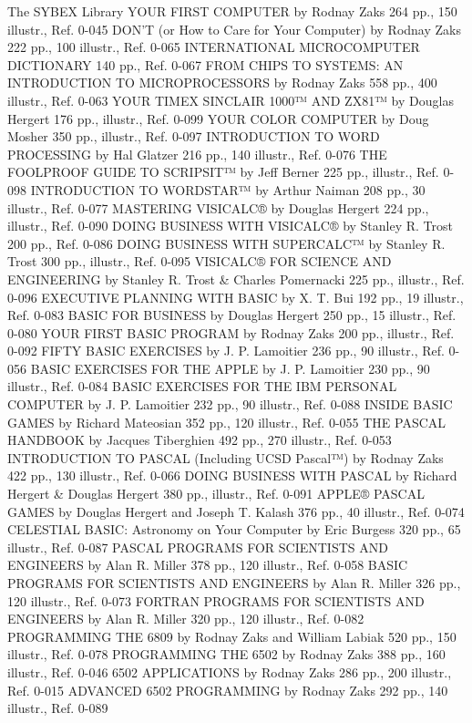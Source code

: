 {{{{{{{{{{{{{{{{{{{{{{{{{{{{{{{{{{{{{{{{{{{{{{{{{{{{{{{{{{{{{{{{{{{{{{{{{{{{{{{{{{{{{{{{{{{{{{{{{{{{{{{{{{{{{{{{{{{{{{{{{{{{{{{{{{{{{{{{{{{{The SYBEX Library
YOUR FIRST COMPUTER
by Rodnay Zaks 264 pp., 150 illustr., Ref. 0-045
DON'T (or How to Care for Your Computer)
by Rodnay Zaks 222 pp., 100 illustr., Ref. 0-065
INTERNATIONAL MICROCOMPUTER DICTIONARY
140 pp., Ref. 0-067
FROM CHIPS TO SYSTEMS:
AN INTRODUCTION TO MICROPROCESSORS
by Rodnay Zaks 558 pp., 400 illustr., Ref. 0-063
YOUR TIMEX SINCLAIR 1000™ AND ZX81™
by Douglas Hergert 176 pp., illustr., Ref. 0-099
YOUR COLOR COMPUTER
by Doug Mosher 350 pp., illustr., Ref. 0-097
INTRODUCTION TO WORD PROCESSING
by Hal Glatzer 216 pp., 140 illustr., Ref. 0-076
THE FOOLPROOF GUIDE TO SCRIPSIT™
by Jeff Berner 225 pp., illustr., Ref. 0-098
INTRODUCTION TO WORDSTAR™
by Arthur Naiman 208 pp., 30 illustr., Ref. 0-077
MASTERING VISICALC®
by Douglas Hergert 224 pp., illustr., Ref. 0-090
DOING BUSINESS WITH VISICALC®
by Stanley R. Trost 200 pp., Ref. 0-086
DOING BUSINESS WITH SUPERCALC™
by Stanley R. Trost 300 pp., illustr., Ref. 0-095
VISICALC® FOR SCIENCE AND ENGINEERING
by Stanley R. Trost & Charles Pomernacki 225 pp., illustr., Ref. 0-096
EXECUTIVE PLANNING WITH BASIC
by X. T. Bui 192 pp., 19 illustr., Ref. 0-083
BASIC FOR BUSINESS
by Douglas Hergert 250 pp., 15 illustr., Ref. 0-080
YOUR FIRST BASIC PROGRAM
by Rodnay Zaks 200 pp., illustr., Ref. 0-092
FIFTY BASIC EXERCISES
by J. P. Lamoitier 236 pp., 90 illustr., Ref. 0-056
BASIC EXERCISES FOR THE APPLE
by J. P. Lamoitier 230 pp., 90 illustr., Ref. 0-084
BASIC EXERCISES FOR THE IBM PERSONAL COMPUTER
by J. P. Lamoitier 232 pp., 90 illustr., Ref. 0-088
INSIDE BASIC GAMES
by Richard Mateosian 352 pp., 120 illustr., Ref. 0-055
THE PASCAL HANDBOOK
by Jacques Tiberghien 492 pp., 270 illustr., Ref. 0-053
INTRODUCTION TO PASCAL (Including UCSD Pascal™)
by Rodnay Zaks 422 pp., 130 illustr., Ref. 0-066
DOING BUSINESS WITH PASCAL
by Richard Hergert & Douglas Hergert 380 pp., illustr., Ref. 0-091
APPLE® PASCAL GAMES
by Douglas Hergert and Joseph T. Kalash 376 pp., 40 illustr., Ref. 0-074
CELESTIAL BASIC: Astronomy on Your Computer
by Eric Burgess 320 pp., 65 illustr., Ref. 0-087
PASCAL PROGRAMS FOR SCIENTISTS AND ENGINEERS
by Alan R. Miller 378 pp., 120 illustr., Ref. 0-058
BASIC PROGRAMS FOR SCIENTISTS AND ENGINEERS
by Alan R. Miller 326 pp., 120 illustr., Ref. 0-073
FORTRAN PROGRAMS FOR SCIENTISTS AND ENGINEERS
by Alan R. Miller 320 pp., 120 illustr., Ref. 0-082
PROGRAMMING THE 6809
by Rodnay Zaks and William Labiak 520 pp., 150 illustr., Ref. 0-078
PROGRAMMING THE 6502
by Rodnay Zaks 388 pp., 160 illustr., Ref. 0-046
6502 APPLICATIONS
by Rodnay Zaks 286 pp., 200 illustr., Ref. 0-015
ADVANCED 6502 PROGRAMMING
by Rodnay Zaks 292 pp., 140 illustr., Ref. 0-089
}}}}}}}}}}}}}}}}}}}}}}}}}}}}}}}}}}}}}}}}}}}}}}}}}}}}}}}}}}}}}}}}}}}}}}}}}}}}}}}}}}}}}}}}}}}}}}}}}}}}}}}}}}}}}}}}}}}}}}}}}}}}}}}}}}}}}}}}}}}}
